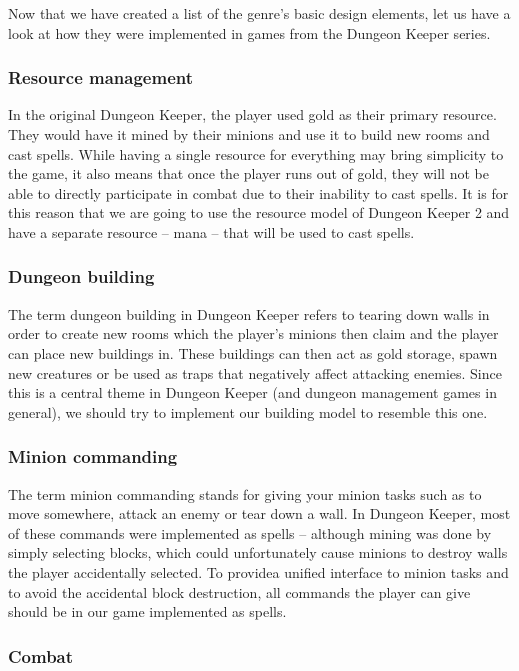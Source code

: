 Now that we have created a list of the genre's basic design elements, let us have a look at how they were implemented in games from the
Dungeon Keeper series.

\subsubsection{Resource management}

In the original Dungeon Keeper, the player used gold as their primary resource. They would have it mined by their minions and use
it to build new rooms and cast spells. While having a single resource for everything may bring simplicity to the game, it also means
that once the player runs out of gold, they will not be able to directly participate in combat due to their inability to cast spells.
It is for this reason that we are going to use the resource model of Dungeon Keeper 2 and have a separate resource -- mana -- that
will be used to cast spells.


\subsubsection{Dungeon building}

The term dungeon building in Dungeon Keeper refers to tearing down walls in order to create new rooms which the player's minions 
then claim and the player can place new buildings in. These buildings can then act as gold storage, spawn new creatures or be used
as traps that negatively affect attacking enemies. Since this is a central theme in Dungeon Keeper (and dungeon management games
in general), we should try to implement our building model to resemble this one.

\subsubsection{Minion commanding}

The term minion commanding stands for giving your minion tasks such as to move somewhere, attack an enemy or tear down a wall. In
Dungeon Keeper, most of these commands were implemented as spells -- although mining was done by simply selecting blocks, which
could unfortunately cause minions to destroy walls the player accidentally selected. To providea unified interface to minion tasks
and to avoid the accidental block destruction, all commands the player can give should be in our game implemented as spells.


\subsubsection{Combat}

